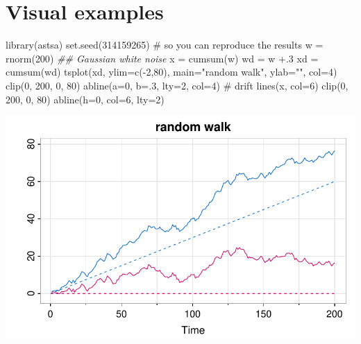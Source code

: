\documentclass[
  letterpaper,
  DIV=11,
  numbers=noendperiod]{scrreprt}
\newenvironment{Shaded}{\begin{snugshade}}{\end{snugshade}}
\newcommand{\AttributeTok}[1]{\textcolor[rgb]{0.40,0.45,0.13}{#1}}
\newcommand{\CommentTok}[1]{\textcolor[rgb]{0.37,0.37,0.37}{#1}}
\newcommand{\DecValTok}[1]{\textcolor[rgb]{0.68,0.00,0.00}{#1}}
\newcommand{\DocumentationTok}[1]{\textcolor[rgb]{0.37,0.37,0.37}{\textit{#1}}}
\newcommand{\FunctionTok}[1]{\textcolor[rgb]{0.28,0.35,0.67}{#1}}
\newcommand{\NormalTok}[1]{\textcolor[rgb]{0.00,0.23,0.31}{#1}}
\newcommand{\OtherTok}[1]{\textcolor[rgb]{0.00,0.23,0.31}{#1}}
\newcommand{\SpecialCharTok}[1]{\textcolor[rgb]{0.37,0.37,0.37}{#1}}
\newcommand{\StringTok}[1]{\textcolor[rgb]{0.13,0.47,0.30}{#1}}
\begin{document}
\section{Visual examples}\label{visual-examples}

\begin{Shaded}
\begin{Highlighting}[]
\FunctionTok{library}\NormalTok{(astsa)}
\FunctionTok{set.seed}\NormalTok{(}\DecValTok{314159265}\NormalTok{) }\CommentTok{\# so you can reproduce the results}
\NormalTok{w  }\OtherTok{=} \FunctionTok{rnorm}\NormalTok{(}\DecValTok{200}\NormalTok{)  }\DocumentationTok{\#\# Gaussian white noise}
\NormalTok{x  }\OtherTok{=} \FunctionTok{cumsum}\NormalTok{(w)}
\NormalTok{wd }\OtherTok{=}\NormalTok{ w }\SpecialCharTok{+}\NormalTok{.}\DecValTok{3} 
\NormalTok{xd }\OtherTok{=} \FunctionTok{cumsum}\NormalTok{(wd)}
\FunctionTok{tsplot}\NormalTok{(xd, }\AttributeTok{ylim=}\FunctionTok{c}\NormalTok{(}\SpecialCharTok{{-}}\DecValTok{2}\NormalTok{,}\DecValTok{80}\NormalTok{), }\AttributeTok{main=}\StringTok{"random walk"}\NormalTok{, }\AttributeTok{ylab=}\StringTok{""}\NormalTok{, }\AttributeTok{col=}\DecValTok{4}\NormalTok{)}
 \FunctionTok{clip}\NormalTok{(}\DecValTok{0}\NormalTok{, }\DecValTok{200}\NormalTok{, }\DecValTok{0}\NormalTok{, }\DecValTok{80}\NormalTok{)}
 \FunctionTok{abline}\NormalTok{(}\AttributeTok{a=}\DecValTok{0}\NormalTok{, }\AttributeTok{b=}\NormalTok{.}\DecValTok{3}\NormalTok{, }\AttributeTok{lty=}\DecValTok{2}\NormalTok{, }\AttributeTok{col=}\DecValTok{4}\NormalTok{) }\CommentTok{\# drift}
\FunctionTok{lines}\NormalTok{(x, }\AttributeTok{col=}\DecValTok{6}\NormalTok{)}
 \FunctionTok{clip}\NormalTok{(}\DecValTok{0}\NormalTok{, }\DecValTok{200}\NormalTok{, }\DecValTok{0}\NormalTok{, }\DecValTok{80}\NormalTok{)}
 \FunctionTok{abline}\NormalTok{(}\AttributeTok{h=}\DecValTok{0}\NormalTok{, }\AttributeTok{col=}\DecValTok{6}\NormalTok{, }\AttributeTok{lty=}\DecValTok{2}\NormalTok{)}
\end{Highlighting}
\end{Shaded}

\includegraphics{LectureNotes/Lecture2_files/figure-pdf/unnamed-chunk-10-1.pdf}
\end{document}
